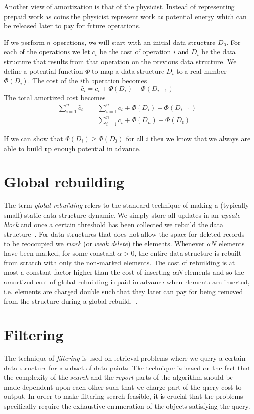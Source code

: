 \documentclass[twoside,11pt,openright]{report}
\begin{document}
Another view of amortization is that of the physicist. Instead of representing prepaid work as coins the physicist represent work as potential energy which can be released later to pay for future operations.

If we perform $n$ operations, we will start with an initial data structure $D_0$. For each of the operations we let $c_i$ be the cost of operation $i$ and $D_i$ be the data structure that results from that operation on the previous data structure. We define a potential function $\Phi$ to map a data structure $D_i$ to a real number $\Phi(D_i)$. The cost of the $i$th operation becomes
$$\hat{c}_i = c_i + \Phi(D_i) - \Phi(D_{i-1})$$
The total amortized cost becomes
\begin{align*}
\sum_{i=1}^n \hat{c}_i &= \sum_{i=1}^n c_i + \Phi(D_i) - \Phi(D_{i-1}) \\
&= \sum_{i=1}^n c_i + \Phi(D_n) - \Phi(D_{0})
\end{align*}

If we can show that $\Phi(D_i) \geq \Phi(D_0)$ for all $i$ then we know that we always are able to build up enough potential in advance.

\section{Global rebuilding}
\label{sec:prelim_global_rebuilding}
The term \textit{global rebuilding} refers to the standard technique of making a (typically small) static data structure dynamic. We simply store all updates in an \textit{update block} and once a certain threshold has been collected we rebuild the data structure~\cite{ionote}. For data structures that does not allow the space for deleted records to be reoccupied we \textit{mark} (or \textit{weak delete}) the elements. Whenever $\alpha N$ elements have been marked, for some constant $\alpha > 0$, the entire data structure is rebuilt from scratch with only the non-marked elements. The cost of rebuilding is at most a constant factor higher than the cost of inserting $\alpha N$ elements and so the amortized cost of global rebuilding is paid in advance when elements are inserted, i.e. elements are charged double such that they later can pay for being removed from the structure during a global rebuild.~\cite{Meyer:2003/AMH/1744652}.

\section{Filtering}
\label{sec:filtering}
The technique of \textit{filtering} is used on retrieval problems where we query a certain data structure for a subset of data points. The technique is based on the fact that the complexity of the \textit{search} and the \textit{report} parts of the algorithm should be made dependent upon each other such that we charge part of the query cost to output. In order to make filtering search feasible, it is crucial that the problems specifically require the exhaustive enumeration of the objects satisfying the query.
\end{document}
